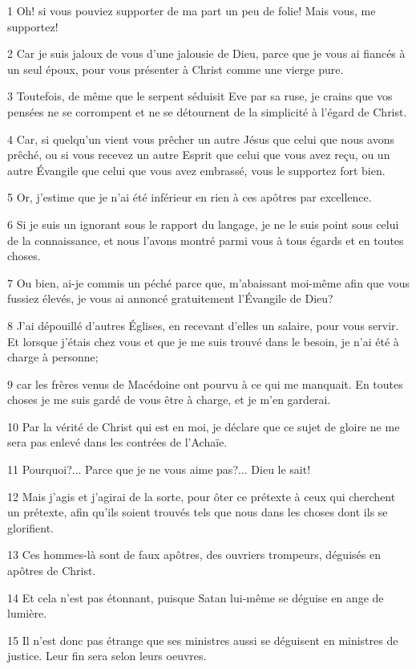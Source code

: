 \par 1 Oh! si vous pouviez supporter de ma part un peu de folie! Mais vous, me supportez!
\par 2 Car je suis jaloux de vous d'une jalousie de Dieu, parce que je vous ai fiancés à un seul époux, pour vous présenter à Christ comme une vierge pure.
\par 3 Toutefois, de même que le serpent séduisit Eve par sa ruse, je crains que vos pensées ne se corrompent et ne se détournent de la simplicité à l'égard de Christ.
\par 4 Car, si quelqu'un vient vous prêcher un autre Jésus que celui que nous avons prêché, ou si vous recevez un autre Esprit que celui que vous avez reçu, ou un autre Évangile que celui que vous avez embrassé, vous le supportez fort bien.
\par 5 Or, j'estime que je n'ai été inférieur en rien à ces apôtres par excellence.
\par 6 Si je suis un ignorant sous le rapport du langage, je ne le suis point sous celui de la connaissance, et nous l'avons montré parmi vous à tous égards et en toutes choses.
\par 7 Ou bien, ai-je commis un péché parce que, m'abaissant moi-même afin que vous fussiez élevés, je vous ai annoncé gratuitement l'Évangile de Dieu?
\par 8 J'ai dépouillé d'autres Églises, en recevant d'elles un salaire, pour vous servir. Et lorsque j'étais chez vous et que je me suis trouvé dans le besoin, je n'ai été à charge à personne;
\par 9 car les frères venus de Macédoine ont pourvu à ce qui me manquait. En toutes choses je me suis gardé de vous être à charge, et je m'en garderai.
\par 10 Par la vérité de Christ qui est en moi, je déclare que ce sujet de gloire ne me sera pas enlevé dans les contrées de l'Achaïe.
\par 11 Pourquoi?... Parce que je ne vous aime pas?... Dieu le sait!
\par 12 Mais j'agis et j'agirai de la sorte, pour ôter ce prétexte à ceux qui cherchent un prétexte, afin qu'ils soient trouvés tels que nous dans les choses dont ils se glorifient.
\par 13 Ces hommes-là sont de faux apôtres, des ouvriers trompeurs, déguisés en apôtres de Christ.
\par 14 Et cela n'est pas étonnant, puisque Satan lui-même se déguise en ange de lumière.
\par 15 Il n'est donc pas étrange que ses ministres aussi se déguisent en ministres de justice. Leur fin sera selon leurs oeuvres.
